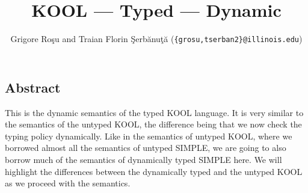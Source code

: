 \setlength{\parindent}{1em}
\title{KOOL --- Typed --- Dynamic}
\author{Grigore Ro\c{s}u and 
        Traian Florin \c{S}erb\u{a}nu\c{t}\u{a}
        (\texttt{\{grosu,tserban2\}@illinois.edu})}

\maketitle

\begin{kblock}[text]
\section{Abstract}
This is the \K dynamic semantics of the typed KOOL language.
It is very similar to the semantics of the untyped KOOL, the
difference being that we now check the typing policy dynamically.
Like in the semantics of untyped KOOL, where we borrowed almost all
the semantics of untyped SIMPLE, we are going to also borrow much of
the semantics of dynamically typed SIMPLE here.  We will
highlight the differences between the dynamically typed and the
untyped KOOL as we proceed with the semantics.
\end{kblock}

\vspace*{3ex}
